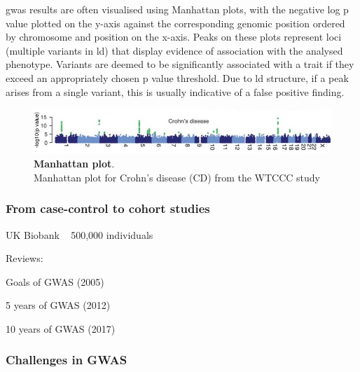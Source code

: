 \gls{gwas} results are often visualised using Manhattan plots, with the negative log p value plotted on the y-axis against the corresponding genomic position ordered by chromosome and position on the x-axis. 
Peaks on these plots represent loci (multiple variants in \gls{ld}) that display evidence of association with the analysed phenotype. 
Variants are deemed to be significantly associated with a trait if they exceed an appropriately chosen p value threshold. 
Due to \gls{ld} structure, if a peak arises from a single variant, this is usually indicative of a false positive finding.

\begin{figure}[h]
\centering
\includegraphics[width=15cm]{Chapter1/Fig/Manhattan_plots_CD_WTCCC_2007.jpg}
\caption[\textbf{Manhattan plot}]{\textbf{Manhattan plot}.\\
Manhattan plot for Crohn's disease (CD) from the WTCCC study \cite{wellcome2007genome}}
\label{fig:molecular_genetic_associations}
\end{figure}

\subsubsection{From case-control to cohort studies}

UK Biobank ~ 500,000 individuals \cite{bycroft2018uk}



Reviews:

Goals of GWAS (2005) \cite{hirschhorn2005genome}

5 years of GWAS (2012) \cite{visscher2012five}

10 years of GWAS (2017) \cite{visscher201710}

\subsubsection{Challenges in GWAS}




